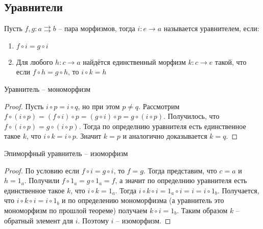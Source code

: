 \subsection{Уравнители}
\begin{defn}
  Пусть $f, g \colon a \rightrightarrows b$ -- пара морфизмов, тогда $i \colon e \to
  a$ называется уравнителем, если:
  \begin{enumerate}
    \item $f \circ i = g \circ i$
    \item Для любого $h \colon c \to a$ найдётся единственный морфизм
      $k \colon c \to e$ такой, что если $f \circ h = g \circ h$,
      то $i \circ k = h$
  \end{enumerate}
\end{defn}

\begin{thm}
  Уравнитель -- мономорфизм
\end{thm}
\begin{proof}
  Пусть $i \circ p = i \circ q$, но при этом $p \neq q$. Рассмотрим $f \circ (i
  \circ p) = (f \circ i) \circ p = (g \circ i) \circ p = g \circ (i \circ p)$.
  Получилось, что $f \circ (i \circ p) = g \circ (i \circ p)$. Тогда по определнию
  уравнителя есть единственное такое $k$, что $i \circ k = i \circ p$. Значит $k
  = p$ и аналогично доказывается $k = q$.
\end{proof}

\begin{thm}
  Эпиморфный уравнитель -- изоморфизм
\end{thm}
\begin{proof}
  По условию если $f \circ i = g \circ i$, то $f = g$. Тогда представим, что $c
  = a$ и $h = 1_a$. Получили $f \circ 1_a = g \circ 1_a = f$, а значит
  по определнию уравнителя есть единственное такое $k$, что $i \circ k = 1_a$.
  Тогда $i \circ k \circ i = 1_a \circ i = i = i \circ 1_b$. Получается, что $i
  \circ k \circ i = i \circ 1_b$ и по определению мономорфизма (а уравнитель это
  мономорфизм по прошлой теореме) получаем $k \circ i = 1_b$. Таким образом $k$
  -- обратный элемент для $i$. Поэтому $i$ -- изоморфизм.
\end{proof}

